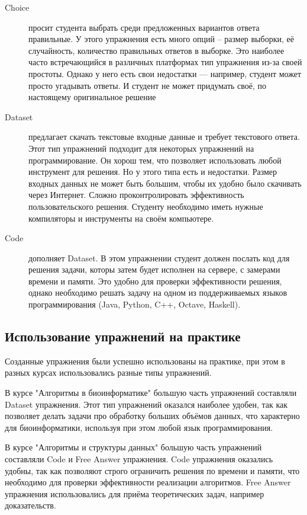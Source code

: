 \documentclass{matmex-diploma-custom}
\begin{document}
\begin{description}
\item[Choice] просит студента выбрать среди предложенных вариантов
  ответа правильные. У этого упражнения есть много опций -- размер
  выборки, её случайность, количество правильных ответов в
  выборке. Это наиболее часто встречающийся в различных платформах тип
  упражнения из-за своей простоты. Однако у него есть свои недостатки
  --- например, студент может просто угадывать ответы. И студент не
  может придумать своё, по настоящему оригинальное решение

\item[Dataset] предлагает скачать текстовые входные данные и требует
  текстового ответа. Этот тип упражнений подходит для некоторых
  упражнений на программирование. Он хорош тем, что позволяет
  использовать любой инструмент для решения. Но у этого типа есть и
  недостатки. Размер входных данных не может быть большим, чтобы их
  удобно было скачивать через Интернет. Сложно проконтролировать
  эффективность пользовательского решения. Студенту необходимо иметь
  нужные компиляторы и инструменты на своём компьютере.

\item[Code] дополняет Dataset. В этом упражнении студент должен
  послать код для решения задачи, которы затем будет исполнен на
  сервере, с замерами времени и памяти. Это удобно для проверки
  эффективности решения, однако необходимо решать задачу на одном из
  поддерживаемых языков программирования (Java, Python, C++, Octave,
  Haskell).

\end{description}

\subsection{Использование упражнений на практике}

Созданные упражнения были успешно использованы на практике, при этом в
разных курсах использовались разные типы упражнений.

В курсе "Алгоритмы в биоинформатике" большую часть упражнений
составляли Dataset упражнения. Этот тип упражнений оказался наиболее
удобен, так как позволяет делать задачи про обработку больших объёмов
данных, что характерно для биоинформатики, используя при этом любой
язык программирования.

В курсе "Алгоритмы и структуры данных" большую часть упражнений
составляли Code и Free Answer упражнения. Code упражнения оказались
удобны, так как позволяют строго ограничить решения по времени и
памяти, что необходимо для проверки эффективности реализации
алгоритмов. Free Answer упражнения использовались для приёма
теоретических задач, например доказательств.
\end{document}
